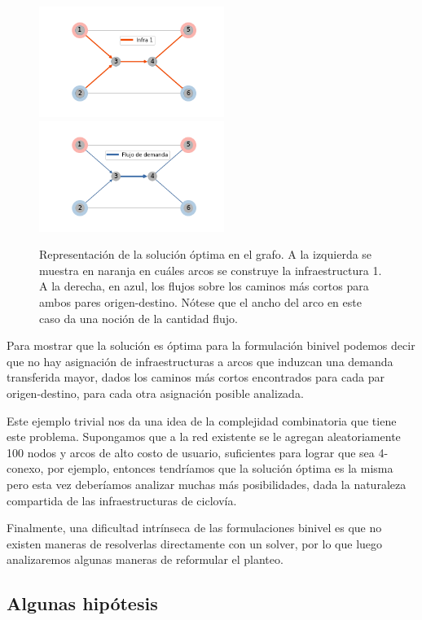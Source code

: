 \documentclass{article}
\begin{document}
  \begin{figure}[h!]
    \centering
    \includegraphics[width=6cm]{../resources/example_1_infras.png}
    \includegraphics[width=6cm]{../resources/example_1_flows.png}
    \caption{Representación de la solución óptima en el grafo. A la izquierda se muestra en naranja en cuáles arcos se construye la infraestructura 1. A la derecha, en azul, los flujos sobre los caminos más cortos para ambos pares origen-destino. Nótese que el ancho del arco en este caso da una noción de la cantidad flujo.}
    \label{fig:example1solution}
  \end{figure}

  Para mostrar que la solución es óptima para la formulación binivel podemos decir que no hay asignación de infraestructuras a arcos que induzcan una demanda transferida mayor, dados los caminos más cortos encontrados para cada par origen-destino, para cada otra asignación posible analizada.

  Este ejemplo trivial nos da una idea de la complejidad combinatoria que tiene este problema. Supongamos que a la red existente se le agregan aleatoriamente 100 nodos y arcos de alto costo de usuario, suficientes para lograr que sea 4-conexo, por ejemplo, entonces tendríamos que la solución óptima es la misma pero esta vez deberíamos analizar muchas más posibilidades, dada la naturaleza compartida de las infraestructuras de ciclovía.

  Finalmente, una dificultad intrínseca de las formulaciones binivel es que no existen maneras de resolverlas directamente con un solver, por lo que luego analizaremos algunas maneras de reformular el planteo.

  \subsection{Algunas hipótesis}
\end{document}
